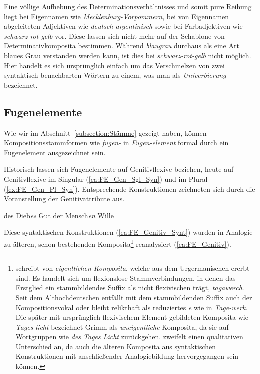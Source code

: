 Eine völlige Aufhebung des Determinationsverhältnisses und somit pure Reihung liegt bei Eigennamen wie \textit{Mecklenburg-Vorpommern}, bei von Eigennamen abgeleiteten Adjektiven wie \textit{deutsch-argentinisch} sowie bei Farbadjektiven wie \textit{schwarz-rot-gelb} vor. Diese lassen sich nicht mehr auf der Schablone von Determinativkomposita bestimmen. Während \textit{blaugrau} durchaus als eine Art blaues Grau verstanden werden kann, ist dies bei \textit{schwarz-rot-gelb} nicht möglich. Hier handelt es sich ursprünglich einfach um das Verschmelzen von zwei syntaktisch benachbarten Wörtern zu einem, was man als \textit{Univerbierung} bezeichnet.  


\subsection{Fugenelemente}\label{subsection:Fuge}

Wie wir im Abschnitt~\ref{subsection:Stämme} gezeigt haben, können Kompositionsstammformen wie \textit{fugen-} in \textit{Fugen-element} formal durch ein Fugenelement ausgezeichnet sein. 

Historisch lassen sich Fugenelemente auf Genitivflexive beziehen, heute auf Genitivflexive im Singular (\ref{ea:FE_Gen_Sgl_Syn}) und im Plural (\ref{ex:FE_Gen_Pl_Syn}). Entsprechende Konstruktionen zeichneten sich durch die Voranstellung der Genitivattribute aus.

\ea \label{ea:FE_Genitiv_Synt}
\ea \label{ea:FE_Gen_Sgl_Syn} des Dieb\textit{es} Gut
\ex \label{ex:FE_Gen_Pl_Syn} der Mensch\textit{en} Wille
\z 
\z 

\newpage
Diese syntaktischen Konstruktionen (\ref{ea:FE_Genitiv_Synt}) wurden in Analogie zu älteren, schon bestehenden Komposita\footnote{\citet[408, 597--600]{Grimm1826Gr2} schreibt von \textit{eigentlichen Komposita}, welche aus dem Urgermanischen ererbt sind. Es handelt sich um flexionslose Stammverbindungen, in denen das Erstglied ein stammbildendes Suffix als nicht flexivischen  trägt, \zB \textit{tagawerch}. Seit dem Althochdeutschen entfällt mit dem stammbildenden Suffix auch der Kompositionsvokal oder bleibt relikthaft als reduziertes \textit{e} wie in \textit{Tage-werk}. Die später mit ursprünglich flexivischem Element gebildeten Komposita wie \textit{Tages-licht} bezeichnet Grimm als \textit{uneigentliche} Komposita, da sie auf Wortgruppen wie \textit{des Tages Licht} zurückgehen. \citet[6]{Paul1920Wb} zweifelt einen qualitativen Unterschied an, da auch die älteren Komposita aus syntaktischen Konstruktionen mit anschließender Analogiebildung hervorgegangen sein können.} reanalysiert (\ref{ea:FE_Genitiv}).

